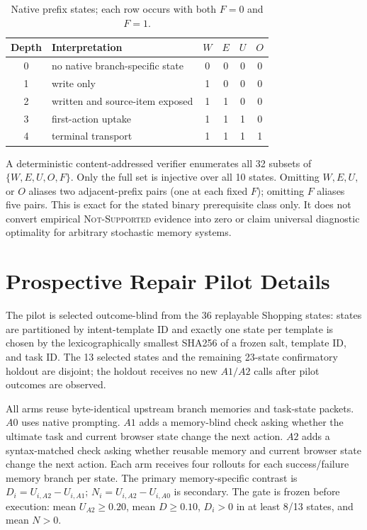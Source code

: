 \begin{table}[h]
\centering
\small
\caption{Native prefix states; each row occurs with both $F=0$ and $F=1$.}
\label{tab:diagnostic-prefix-class}
\begin{tabular}{clcccc}
\toprule
Depth & Interpretation & $W$ & $E$ & $U$ & $O$ \\
\midrule
0 & no native branch-specific state & 0 & 0 & 0 & 0 \\
1 & write only & 1 & 0 & 0 & 0 \\
2 & written and source-item exposed & 1 & 1 & 0 & 0 \\
3 & first-action uptake & 1 & 1 & 1 & 0 \\
4 & terminal transport & 1 & 1 & 1 & 1 \\
\bottomrule
\end{tabular}
\end{table}

A deterministic content-addressed verifier enumerates all 32 subsets of $\{W,E,U,O,F\}$. Only the full set is injective over all 10 states. Omitting $W,E,U,$ or $O$ aliases two adjacent-prefix pairs (one at each fixed $F$); omitting $F$ aliases five pairs. This is exact for the stated binary prerequisite class only. It does not convert empirical \textsc{Not-Supported} evidence into zero or claim universal diagnostic optimality for arbitrary stochastic memory systems.

\section{Prospective Repair Pilot Details}
\label{sec:repair-pilot-details}
The pilot is selected outcome-blind from the 36 replayable Shopping states: states are partitioned by intent-template ID and exactly one state per template is chosen by the lexicographically smallest SHA256 of a frozen salt, template ID, and task ID. The 13 selected states and the remaining 23-state confirmatory holdout are disjoint; the holdout receives no new $A1/A2$ calls after pilot outcomes are observed.

All arms reuse byte-identical upstream branch memories and task-state packets. $A0$ uses native prompting. $A1$ adds a memory-blind check asking whether the ultimate task and current browser state change the next action. $A2$ adds a syntax-matched check asking whether reusable memory and current browser state change the next action. Each arm receives four rollouts for each success/failure memory branch per state. The primary memory-specific contrast is $D_i=U_{i,A2}-U_{i,A1}$; $N_i=U_{i,A2}-U_{i,A0}$ is secondary. The gate is frozen before execution: mean $U_{A2}\ge0.20$, mean $D\ge0.10$, $D_i>0$ in at least 8/13 states, and mean $N>0$.

